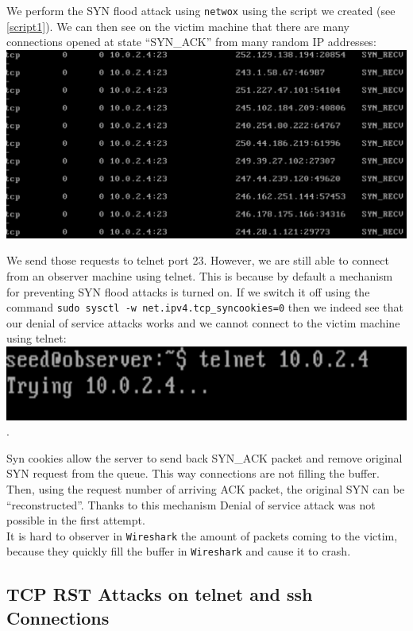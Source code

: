 \documentclass[12pt, a4paper]{article}
\begin{document}
We perform the SYN flood attack using \texttt{netwox} using the script we created (see \ref{script1}). We can then see on the victim machine that there are many connections opened at state ``SYN\_ACK'' from many random IP addresses:\\
\includegraphics[width=.95\textwidth]{gfx/syn-netstat.png}

We send those requests to telnet port 23. However, we are still able to connect from an observer machine using telnet. This is because by default a mechanism for preventing SYN flood attacks is turned on. If we switch it off using the command \texttt{sudo sysctl -w net.ipv4.tcp\_syncookies=0} then we indeed see that our denial of service attacks works and we cannot connect to the victim machine using telnet:\\

\includegraphics[width=.95\textwidth]{gfx/syn-telnet.png}.

Syn cookies allow the server to send back SYN\_ACK packet and remove original SYN request from the queue. This way connections are not filling the buffer. Then, using the request number of arriving ACK packet, the original SYN can be ``reconstructed''. Thanks to this mechanism Denial of service attack was not possible in the first attempt.\\

It is hard to observer in \texttt{Wireshark} the amount of packets coming to the victim, because they quickly fill the buffer in \texttt{Wireshark} and cause it to crash.

\subsection{TCP RST Attacks on telnet and ssh Connections}
\end{document}
